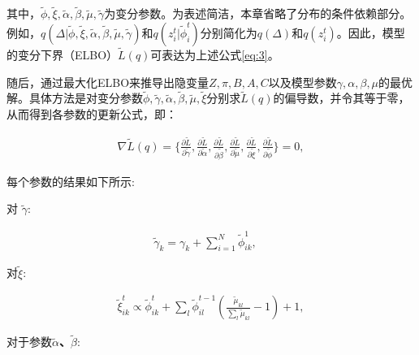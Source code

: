 其中，$\widetilde{\phi}, \widetilde{\xi}, \widetilde{\alpha}, \widetilde{\beta}, \widetilde{\mu}, \widetilde{\gamma}$为变分参数。为表述简洁，本章省略了分布的条件依赖部分。例如，$q(\Delta|\widetilde{\phi},\widetilde{\xi},\widetilde{\alpha},\widetilde{\beta},\widetilde{\mu},\widetilde{\gamma})$和$q(z_i^t|\widetilde{\phi}_i^t)$分别简化为$q(\Delta)$和$q(z_i^t)$。因此，模型的变分下界（ELBO）$\widetilde{L}(q)$可表达为上述公式\ref{eq:3}。

随后，通过最大化ELBO来推导出隐变量$Z, \pi, B, A, C$以及模型参数$\gamma, \alpha, \beta, \mu$的最优解。具体方法是对变分参数$\widetilde{\phi}, \widetilde{\gamma}, \widetilde{\alpha}, \widetilde{\beta}, \widetilde{\mu}, \widetilde{\xi}$分别求$\widetilde{L}(q)$的偏导数，并令其等于零，从而得到各参数的更新公式，即：

\begin{equation}
\begin{split}
\nabla \widetilde{L}(q) = \{ \frac{\partial \widetilde{L}}{\partial \widetilde{\gamma}}, \frac{\partial \widetilde{L}}{\partial \widetilde{\alpha}}, \frac{\partial \widetilde{L}}{\partial \widetilde{\beta}}, \frac{\partial \widetilde{L}}{\partial \widetilde{\mu}}, \frac{\partial \widetilde{L}}{\partial \widetilde{\xi}}, \frac{\partial \widetilde{L}}{\partial \widetilde{\phi}} \} = 0 ,
\end{split}
\end{equation}

每个参数的结果如下所示:

对\textbf{ $\widetilde{\gamma}$}:

\begin{equation}
\label{eq4}
\begin{split}
\widetilde{\gamma}_k = \gamma_k + \sum_{i=1}^N \widetilde{\phi}_{ik}^1, \quad
\end{split}
\end{equation}

对\textbf{$\widetilde{\xi}$}:

\begin{equation}
\label{eq5}
\begin{split}
\widetilde{\xi}_{ik}^t \propto \widetilde{\phi}_{ik}^t + \sum_l \widetilde{\phi}_{il}^{t-1}(\frac{\widetilde{\mu}_{kl}}{\sum_l \widetilde{\mu}_{kl}} - 1) + 1 ,
\end{split}
\end{equation}

对于参数\textbf{$\widetilde{\alpha}$、$\widetilde{\beta}$}:


